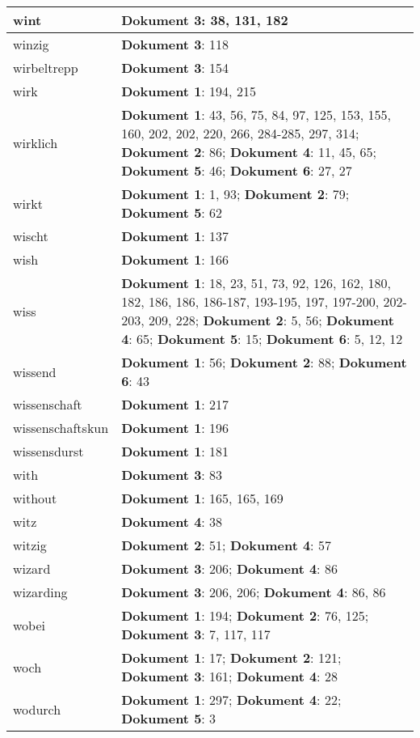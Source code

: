 \documentclass[a5paper]{article}
\begin{document}
\begin{longtable}[l]{|l|p{3in}|}
\hline
wint & \textbf{Dokument 3}: 38, 131, 182 \\
\hline
winzig & \textbf{Dokument 3}: 118 \\
\hline
wirbeltrepp & \textbf{Dokument 3}: 154 \\
\hline
wirk & \textbf{Dokument 1}: 194, 215 \\
\hline
wirklich & \textbf{Dokument 1}: 43, 56, 75, 84, 97, 125, 153, 155, 160, 202, 202, 220, 266, 284-285, 297, 314; \textbf{Dokument 2}: 86; \textbf{Dokument 4}: 11, 45, 65; \textbf{Dokument 5}: 46; \textbf{Dokument 6}: 27, 27 \\
\hline
wirkt & \textbf{Dokument 1}: 1, 93; \textbf{Dokument 2}: 79; \textbf{Dokument 5}: 62 \\
\hline
wischt & \textbf{Dokument 1}: 137 \\
\hline
wish & \textbf{Dokument 1}: 166 \\
\hline
wiss & \textbf{Dokument 1}: 18, 23, 51, 73, 92, 126, 162, 180, 182, 186, 186, 186-187, 193-195, 197, 197-200, 202-203, 209, 228; \textbf{Dokument 2}: 5, 56; \textbf{Dokument 4}: 65; \textbf{Dokument 5}: 15; \textbf{Dokument 6}: 5, 12, 12 \\
\hline
wissend & \textbf{Dokument 1}: 56; \textbf{Dokument 2}: 88; \textbf{Dokument 6}: 43 \\
\hline
wissenschaft & \textbf{Dokument 1}: 217 \\
\hline
wissenschaftskun & \textbf{Dokument 1}: 196 \\
\hline
wissensdurst & \textbf{Dokument 1}: 181 \\
\hline
with & \textbf{Dokument 3}: 83 \\
\hline
without & \textbf{Dokument 1}: 165, 165, 169 \\
\hline
witz & \textbf{Dokument 4}: 38 \\
\hline
witzig & \textbf{Dokument 2}: 51; \textbf{Dokument 4}: 57 \\
\hline
wizard & \textbf{Dokument 3}: 206; \textbf{Dokument 4}: 86 \\
\hline
wizarding & \textbf{Dokument 3}: 206, 206; \textbf{Dokument 4}: 86, 86 \\
\hline
wobei & \textbf{Dokument 1}: 194; \textbf{Dokument 2}: 76, 125; \textbf{Dokument 3}: 7, 117, 117 \\
\hline
woch & \textbf{Dokument 1}: 17; \textbf{Dokument 2}: 121; \textbf{Dokument 3}: 161; \textbf{Dokument 4}: 28 \\
\hline
wodurch & \textbf{Dokument 1}: 297; \textbf{Dokument 4}: 22; \textbf{Dokument 5}: 3 \\

\end{longtable}
\end{document}
